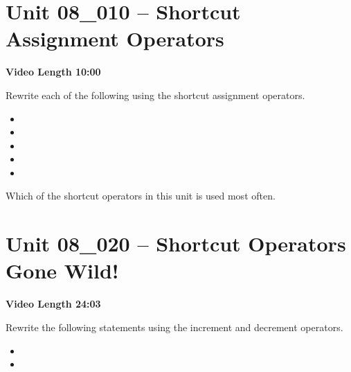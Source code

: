 \documentclass[letterpaper,12pt]{exam}
\newcommand{\unit}{Unit 08}
\begin{document}
\section*{\unit\_010 -- Shortcut Assignment Operators} %
\par{\selectfont\textbf{Video Length 10:00}}

\begin{questions}
\begin{samepage}
    \question Rewrite each of the following using the shortcut assignment operators.
      \begin{itemize}
        \item {}
        \vspace{5mm}
        \item {}
        \vspace{5mm}
        \item {}
        \vspace{5mm}
        \item {}
        \vspace{5mm}
        \item {}
        \vspace{5mm}
       \end{itemize}
\end{samepage}

\begin{samepage}
    \question Which of the shortcut operators in this unit is used most often.
    \vspace{5mm}
\end{samepage}


\section*{\unit\_020 -- Shortcut Operators Gone Wild!} %
\par{\selectfont\textbf{Video Length 24:03}}

\begin{samepage}
    \question Rewrite the following statements using the increment and decrement operators.
      \begin{itemize}
        \item {}
        \vspace{5mm}
        \item {}
        \vspace{5mm}
       \end{itemize}
\end{samepage}


\end{questions}
\end{document}

